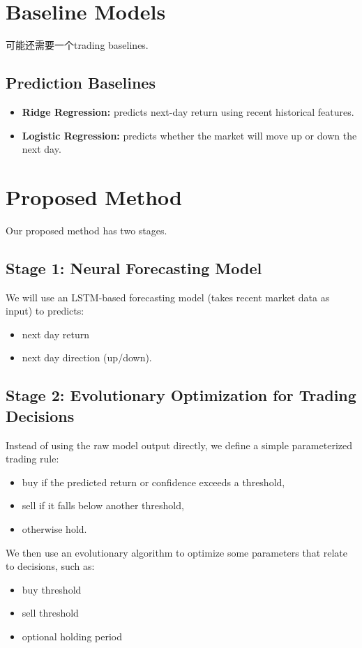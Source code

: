 \documentclass[12pt, a4paper]{article}
\begin{document}
\section{Baseline Models}
可能还需要一个trading baselines.

\subsection{Prediction Baselines}
\begin{itemize}
    \item \textbf{Ridge Regression:} predicts next-day return using recent historical features. 
    \item \textbf{Logistic Regression:} predicts whether the market will move up or down the next day. 
\end{itemize}

\section{Proposed Method}
Our proposed method has two stages.

\subsection{Stage 1: Neural Forecasting Model}
We will use an LSTM-based forecasting model (takes recent market data as input) to predicts:
\begin{itemize}
    \item next day return
    \item next day direction (up/down).
\end{itemize}

\subsection{Stage 2: Evolutionary Optimization for Trading Decisions}
Instead of using the raw model output directly, we define a simple parameterized trading rule:
\begin{itemize}
    \item buy if the predicted return or confidence exceeds a threshold,
    \item sell if it falls below another threshold,
    \item otherwise hold.
\end{itemize}

We then use an evolutionary algorithm to optimize some parameters that relate to decisions, such as:
\begin{itemize}
    \item buy threshold
    \item sell threshold
    \item optional holding period
\end{itemize}
\end{document}
